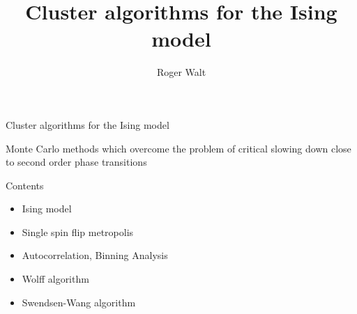 \documentclass[]{beamer}
\begin{document}
\title{Cluster algorithms for the Ising model}
\author{Roger Walt}

\begin{frame}
	\huge{Cluster algorithms for the Ising model}
	\vspace*{5pt}

	\Large{Monte Carlo methods which overcome the problem of critical slowing down close to second order phase transitions}
	\note{ }
\end{frame}

\begin{frame}{Contents}
\begin{itemize}
\item Ising model
\item Single spin flip metropolis
\item Autocorrelation, Binning Analysis
\item Wolff algorithm
\item Swendsen-Wang algorithm
\end{itemize}
\note{ }
\end{frame}
\end{document}
